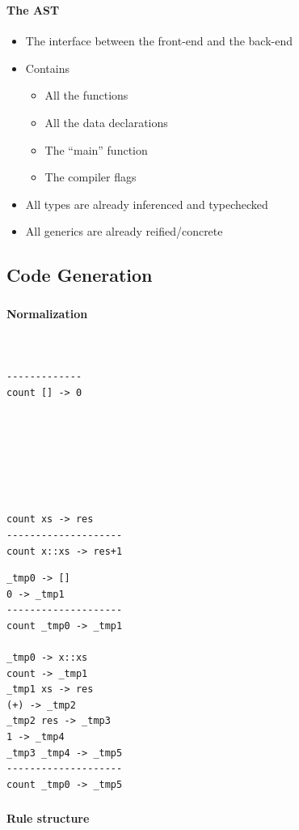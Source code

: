 \begin{frame}
    \frametitle{\subsecname}
    \framesubtitle{The AST}
    \begin{itemize}
    \item The interface between the front-end and the back-end
    \item Contains
        \begin{itemize}
        \item All the functions
        \item All the data declarations
        \item The “main” function
        \item The compiler flags
        \end{itemize}
    \item All types are already inferenced and typechecked
    \item All generics are already reified/concrete
    \end{itemize}
\end{frame}


\subsection{Code Generation}

\begin{frame}[fragile]
    \frametitle{\subsecname}
    \framesubtitle{Normalization}
    \begin{multicols}{2}
    \begin{lstlisting}


-------------
count [] -> 0







count xs -> res
--------------------
count x::xs -> res+1
    \end{lstlisting}
    \columnbreak
    \begin{lstlisting}
_tmp0 -> []
0 -> _tmp1
--------------------
count _tmp0 -> _tmp1

_tmp0 -> x::xs
count -> _tmp1
_tmp1 xs -> res
(+) -> _tmp2
_tmp2 res -> _tmp3
1 -> _tmp4
_tmp3 _tmp4 -> _tmp5
--------------------
count _tmp0 -> _tmp5
    \end{lstlisting}
\end{multicols}
\end{frame}

\begin{frame}[fragile]
    \frametitle{\subsecname}
    \framesubtitle{Rule structure}
    \begin{lstlisting}
    \end{lstlisting}
\end{frame}

